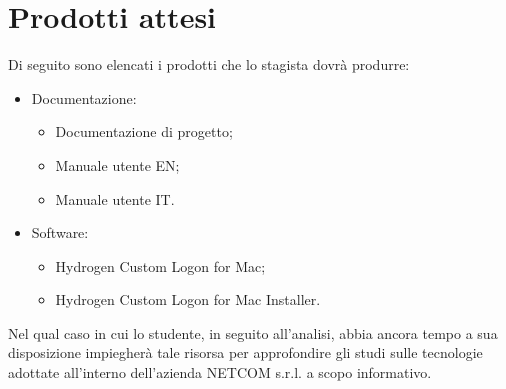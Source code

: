 \section*{Prodotti attesi}
Di seguito sono elencati i prodotti che lo stagista dovrà produrre:
\begin{itemize}
	\item Documentazione:
	\begin{itemize}
		\item Documentazione di progetto;
		\item Manuale utente EN;
		\item Manuale utente IT.
	\end{itemize}
	\item Software:
	\begin{itemize}
		\item Hydrogen Custom Logon for Mac;
		\item Hydrogen Custom Logon for Mac Installer.
	\end{itemize}
\end{itemize}

%
%    
%    

Nel qual caso in cui lo studente, in seguito all'analisi, abbia ancora tempo a sua disposizione impiegherà tale risorsa per approfondire gli studi sulle tecnologie adottate all'interno dell'azienda NETCOM s.r.l. a scopo informativo.
